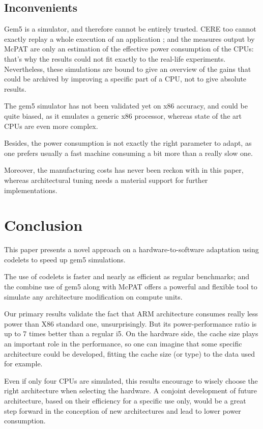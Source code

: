 \documentclass{article}
\begin{document}
\begin{multicols}{2}
\subsection{Inconvenients}
Gem5 is a simulator, and therefore cannot be entirely trusted. CERE too cannot exactly replay a whole execution of an application ; and the measures output by McPAT are only an estimation of the effective power consumption of the CPUs: that's why the results could not fit exactly to the real-life experiments. Nevertheless, these simulations are bound to give an overview of the gains that could be archived by improving a specific part of a CPU, not to give absolute results.

The gem5 simulator has not been validated yet on x86 accuracy, and could be quite biased, as it emulates a generic x86 processor, whereas state of the art CPUs are even more complex.

Besides, the power consumption is not exactly the right parameter to adapt, as one prefers usually a fast machine consuming a bit more than a really slow one.

Moreover, the manufacturing costs has never been reckon with in this paper, whereas architectural tuning needs a material support for further implementations. 


\section{Conclusion}
\label{ccl}
This paper presents a novel approach on a hardware-to-software adaptation using codelets to speed up gem5 simulations. 

The use of codelets is faster and nearly as efficient as regular benchmarks; and the combine use of gem5 along with McPAT offers a powerful and flexible tool to simulate any architecture modification on compute units.

Our primary results validate the fact that ARM architecture consumes really less power than X86 standard one, unsurprisingly. But its power-performance ratio is up to 7 times better than a regular i5. On the hardware side, the cache size plays an important role in the performance, so one can imagine that some specific architecture could be developed, fitting the cache size (or type) to the data used for example.

Even if only four CPUs are simulated, this results encourage to wisely choose the right architecture when selecting the hardware. A conjoint development of future architecture, based on their efficiency for a specific use only, would be a great step forward in the conception of new architectures and lead to lower power consumption. 


\end{multicols}
\end{document}
